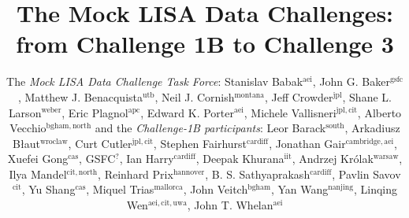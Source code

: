 \documentclass{iopart}
\begin{document}
\title{The Mock LISA Data Challenges: from Challenge 1B to Challenge 3}

\author{The \emph{Mock LISA Data Challenge Task Force}:
Stanislav Babak$^\mathrm{aei}$,
John G. Baker$^\mathrm{gsfc}$,
Matthew J. Benacquista$^\mathrm{utb}$,
Neil J. Cornish$^\mathrm{montana}$,
Jeff Crowder$^\mathrm{jpl}$,
Shane L. Larson$^\mathrm{weber}$,
Eric Plagnol$^\mathrm{apc}$,
Edward K. Porter$^\mathrm{aei}$,
Michele Vallisneri$^\mathrm{jpl,cit}$,
Alberto Vecchio$^\mathrm{bgham,north}$
and the \emph{Challenge-1B participants}:
Leor Barack$^\mathrm{south}$,
Arkadiusz B{\l}aut$^\mathrm{wroclaw}$,
Curt Cutler$^\mathrm{jpl,cit}$,
Stephen Fairhurst$^\mathrm{cardiff}$,
Jonathan Gair$^\mathrm{cambridge,aei}$,
Xuefei Gong$^\mathrm{cas}$,
GSFC$^?$,
Ian Harry$^\mathrm{cardiff}$,
Deepak Khurana$^\mathrm{iit}$,
Andrzej Kr\'olak$^\mathrm{warsaw}$,
Ilya Mandel$^\mathrm{cit,north}$,
Reinhard Prix$^\mathrm{hannover}$,
B. S. Sathyaprakash$^\mathrm{cardiff}$,
Pavlin Savov$^\mathrm{cit}$,
Yu Shang$^\mathrm{cas}$,
Miquel Trias$^\mathrm{mallorca}$,
John Veitch$^\mathrm{bgham}$,
Yan Wang$^\mathrm{nanjing}$,
Linqing Wen$^\mathrm{aei,cit,uwa}$,
John T. Whelan$^\mathrm{aei}$}
\end{document}
